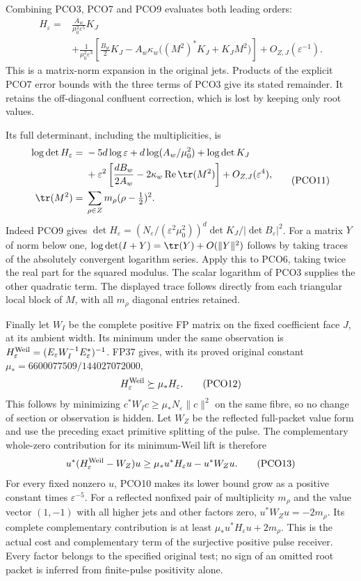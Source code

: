 \documentclass[11pt,a4paper]{article}
\theoremstyle{definition}\newtheorem{definition}[theorem]{Definition}
\begin{document}
Combining PCO3, PCO7 and PCO9 evaluates both leading orders:
\[
\begin{split}
 H_\varepsilon
 ={}&\frac{A_w}{\mu_0^2\varepsilon^5}K_J\\
 &+\frac1{\mu_0^2\varepsilon^3}
   \left[\frac{B_w}{2}K_J
     -A_w\kappa_w\big((M^2)^*K_J+K_JM^2\big)\right]
       +O_{Z,J}(\varepsilon^{-1}).
\end{split}
 \tag{PCO10}\label{pco:matrix-expansion}
\]
This is a matrix-norm expansion in the original jets. Products
of the explicit PCO7 error bounds with the three terms of PCO3
give its stated remainder. It retains the off-diagonal
confluent correction, which is lost by keeping only root values.

Its full determinant, including the multiplicities, is
\[
\begin{split}
 \log\det H_\varepsilon
 ={}&-5d\log\varepsilon+d\log(A_w/\mu_0^2)+\log\det K_J\\
 &+\varepsilon^2\left[
       \frac{dB_w}{2A_w}-2\kappa_w\operatorname{Re}\tr(M^2)
                        \right]+O_{Z,J}(\varepsilon^4),\\
 \tr(M^2)={}&\sum_{\rho\in Z}m_\rho(\rho-\tfrac12)^2.
\end{split}
 \tag{PCO11}\label{pco:determinant}
\]
Indeed PCO9 gives
$\det H_\varepsilon=(N_\varepsilon/(\varepsilon^2\mu_0^2))^d
\det K_J/|\det B_\varepsilon|^2$.
For a matrix $Y$ of norm below one,
$\log\det(I+Y)=\tr(Y)+O(\|Y\|^2)$ follows by taking traces
of the absolutely convergent logarithm series. Apply this to
PCO6, taking twice the real part for the squared modulus.
The scalar logarithm of PCO3 supplies the other quadratic term.
The displayed trace follows directly from each triangular
local block of $M$, with all $m_\rho$ diagonal entries retained.

Finally let $W_I$ be the complete positive FP matrix on the
fixed coefficient face $J$, at its ambient width. Its minimum
under the same observation is
$H_\varepsilon^{\rm Weil}
 =(E_\varepsilon W_I^{-1}E_\varepsilon^*)^{-1}$.
FP37 gives, with its proved original constant
$\mu_*=6600077509/144027072000$,
\[
 H_\varepsilon^{\rm Weil}\succeq\mu_*H_\varepsilon.
 \tag{PCO12}\label{pco:weil-cost}
\]
This follows by minimizing
$c^*W_Ic\ge\mu_*N_\varepsilon\|c\|^2$ on the same fibre,
so no change of section or observation is hidden. Let $W_Z$
be the reflected full-packet value form and use the preceding
exact primitive splitting of the pulse. The complementary
whole-zero contribution for its minimum-Weil lift is therefore
\[
 u^*(H_\varepsilon^{\rm Weil}-W_Z)u
 \ge\mu_*u^*H_\varepsilon u-u^*W_Zu.
 \tag{PCO13}\label{pco:complement}
\]
For every fixed nonzero $u$, PCO10 makes its lower bound
grow as a positive constant times $\varepsilon^{-5}$.
For a reflected nonfixed pair of multiplicity $m_\rho$ and
the value vector $(1,-1)$ with all higher jets and other
factors zero, $u^*W_Zu=-2m_\rho$. Its complete complementary
contribution is at least
$\mu_*u^*H_\varepsilon u+2m_\rho$.
This is the actual cost and complementary term of the
surjective positive pulse receiver. Every factor belongs to
the specified original test; no sign of an omitted root
packet is inferred from finite-pulse positivity alone.
\end{document}
